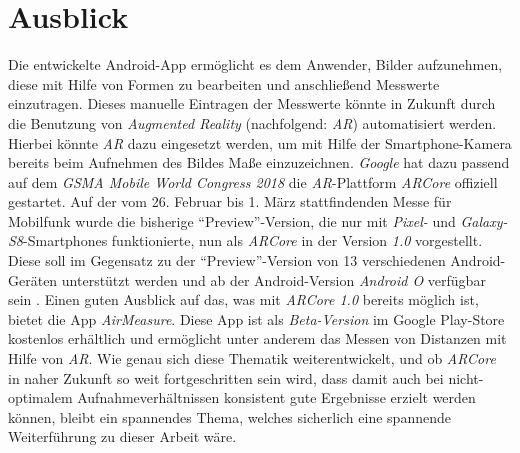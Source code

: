 \section{Ausblick}
Die entwickelte Android-App ermöglicht es dem Anwender, Bilder aufzunehmen, diese mit Hilfe von Formen zu bearbeiten und anschließend Messwerte einzutragen.
Dieses manuelle Eintragen der Messwerte könnte in Zukunft durch die Benutzung von \emph{Augmented Reality} (nachfolgend: \emph{AR}) automatisiert werden.
Hierbei könnte \emph{AR} dazu eingesetzt werden, um mit Hilfe der Smartphone-Kamera bereits beim Aufnehmen des Bildes Maße einzuzeichnen.
\emph{Google} hat dazu passend auf dem \emph{GSMA Mobile World Congress 2018} die \emph{AR}-Plattform \emph{ARCore} offiziell gestartet.
Auf der vom 26. Februar bis 1. März stattfindenden Messe für Mobilfunk wurde die bisherige ``Preview''-Version, die nur mit \emph{Pixel-} und \emph{Galaxy-S8}-Smartphones funktionierte, nun als \emph{ARCore} in der Version \emph{1.0} vorgestellt.
Diese soll im Gegensatz zu der ``Preview''-Version von 13 verschiedenen Android-Geräten unterstützt werden und ab der Android-Version \emph{Android O} verfügbar sein \citep{heise18}.
Einen guten Ausblick auf das, was mit \emph{ARCore 1.0} bereits möglich ist, bietet die App \emph{AirMeasure}. 
Diese App ist als \emph{Beta-Version} im Google Play-Store kostenlos erhältlich und ermöglicht unter anderem das Messen von Distanzen mit Hilfe von \emph{AR}.
Wie genau sich diese Thematik weiterentwickelt, und ob \emph{ARCore} in naher Zukunft so weit fortgeschritten sein wird, dass damit auch bei nicht-optimalem Aufnahmeverhältnissen konsistent gute Ergebnisse erzielt werden können, bleibt ein spannendes Thema, welches sicherlich eine spannende Weiterführung zu dieser Arbeit wäre.
